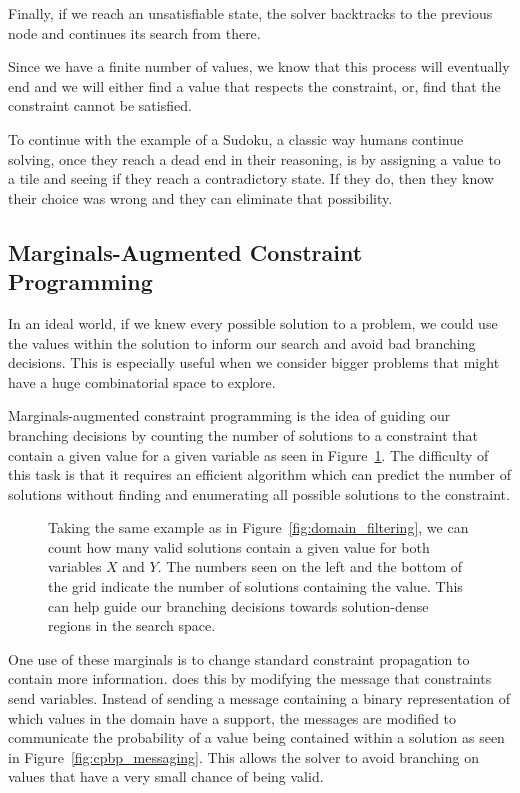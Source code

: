 \documentclass[../Document.tex]{subfiles}
\begin{document}
Finally, if we reach an unsatisfiable state, the solver backtracks to the previous node and continues its search from there.

Since we have a finite number of values, we know that this process will eventually end and we will either find a value that respects the constraint, or, find that the constraint cannot be satisfied.

To continue with the example of a Sudoku, a classic way humans continue solving, once they reach a dead end in their reasoning, is by assigning a value to a tile and seeing if they reach a contradictory state.
If they do, then they know their choice was wrong and they can eliminate that possibility.


\subsection{Marginals-Augmented Constraint Programming}
In an ideal world, if we knew every possible solution to a problem, we could use the values within the solution to inform our search and avoid bad branching decisions. This is especially useful when we consider bigger problems that might have a huge combinatorial space to explore.

Marginals-augmented constraint programming is the idea of guiding our branching decisions by counting the number of solutions to a constraint that contain a given value for a given variable as seen in Figure~\ref{fig:marginal_cp}. The difficulty of this task is that it requires an efficient algorithm which can predict the number of solutions without finding and enumerating all possible solutions to the constraint.

\begin{figure}[ht]
    \centering
    
    \caption[Marginal-Augmented \acrlong{cp}.]{Taking the same example as in Figure~\ref{fig:domain_filtering}, we can count how many valid solutions contain a given value for both variables $X$ and $Y$. The numbers seen on the left and the bottom of the grid indicate the number of solutions containing the value. This can help guide our branching decisions towards solution-dense regions in the search space.}
    \label{fig:marginal_cp}
\end{figure}

One use of these marginals is to change standard constraint propagation to contain more information. \bp does this by modifying the message that constraints send variables. Instead of sending a message containing a binary representation of which values in the domain have a support, the messages are modified to communicate the probability of a value being contained within a solution as seen in Figure~\ref{fig:cpbp_messaging}. This allows the solver to avoid branching on values that have a very small chance of being valid.
\end{document}

